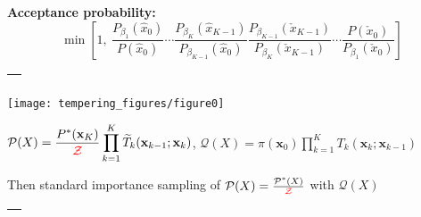 \documentclass[25pt,landscape]{foils}
\newcommand{\Red}{\textcolor{red}}
\newcommand{\Gray}{\textcolor{mygray}}
\newcommand{\Green}{\textcolor{mypine}}
\newcommand{\myfoilhead}[1]{
\newpage
\vspace*{-1cm}
\Gray{
\begin{tabular*}{\textwidth}{l}
{\bf \Huge #1} \\
\bottomrule
\end{tabular*}}}
\newcommand{\bx}{\mathbf{x}}
\newcommand{\Z}{\mathcal{Z}}
\begin{document}
\Green{\bf Acceptance probability:}
\[
\min\left[1,~%
\frac{P_{\beta_1}(\hat{x}_0)}{P(\hat{x}_0)}
\cdots
\frac{P_{\beta_K}(\hat{x}_{K-1})}{P_{\beta_{K-1}}(\hat{x}_0)}
\frac{P_{\beta_{K-1}}(\check{x}_{K-1})}{P_{\beta_K}(\check{x}_{K-1})}
\cdots
\frac{P(\check{x}_0)}{P_{\beta_1}(\check{x}_0)}
\right]
\]



\myfoilhead{\scalebox{0.96}{Annealed Importance Sampling}}

\vfill

\texttt{[image: tempering\_figures/figure0]}

{\small
\vfill
$\displaystyle
\mathcal{P}(X) = \frac{P^*(\bx_K)}{\Red{\Z}} \prod_{k=1}^K \widetilde{T}_k(\bx_{k-1};\bx_k)
$,\hspace*{\fill}
$\displaystyle
\mathcal{Q}(X) = \pi(\bx_0) \prod_{k=1}^K T_k(\bx_k;\bx_{k-1})
$}
\vfill

Then standard importance sampling of $\mathcal{P}(X) = \frac{\mathcal{P}^*(X)}{\Red{\Z}}$ with $\mathcal{Q}(X)$ %


% 
% 
% 

\myfoilhead{\scalebox{0.96}{Annealed Importance Sampling}}
\end{document}
